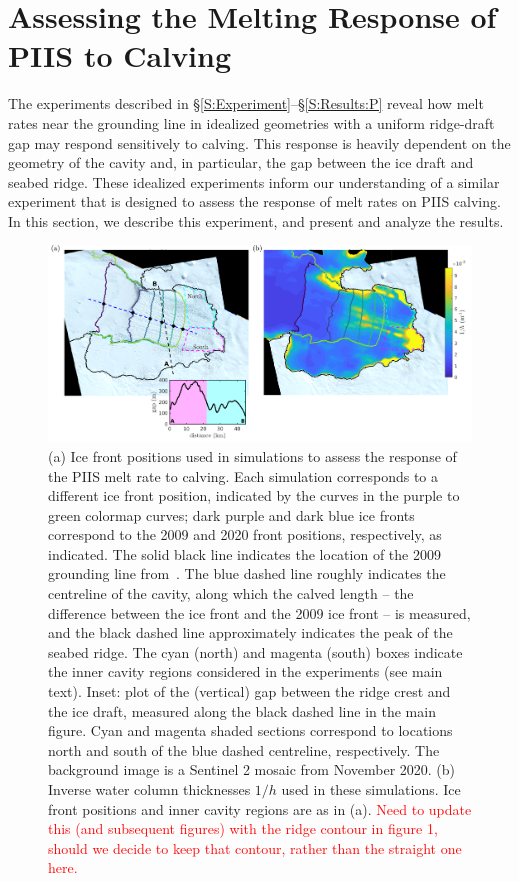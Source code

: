 \documentclass[draft]{agujournal2019}
\newcommand{\red}[1]{\textcolor{red}{#1}}
\begin{document}
\section{Assessing the Melting Response of PIIS to Calving}\label{S:Realistic}
The experiments described in \S\ref{S:Experiment}--\S\ref{S:Results:P} reveal how melt rates near the grounding line in idealized geometries with a uniform ridge-draft gap may respond sensitively to calving. This response is heavily dependent on the geometry of the cavity and, in particular, the gap between the ice draft and seabed ridge. These idealized experiments inform our understanding of a similar experiment that is designed to assess the response of melt rates on PIIS calving. In this section, we describe this experiment, and present and analyze the results.

\begin{figure}
    \centering
    \includegraphics[width =\textwidth]{../make_figures/plots/figure10_combined.pdf}
    \caption{(a) Ice front positions used in simulations to assess the response of the PIIS melt rate to calving. Each simulation corresponds to a different ice front position, indicated by the curves in the purple to green colormap curves; dark purple and dark blue ice fronts correspond to the 2009 and 2020 front positions, respectively, as indicated. The solid black line indicates the location of the 2009 grounding line from~. The blue dashed line roughly indicates the centreline of the cavity, along which the calved length -- the difference between the ice front and the 2009 ice front -- is measured, and the black dashed line approximately indicates the peak of the seabed ridge. The cyan (north) and magenta (south) boxes indicate the inner cavity regions considered in the experiments (see main text). Inset: plot of the (vertical) gap between the ridge crest and the ice draft, measured along the black dashed line in the main figure. Cyan and magenta shaded sections correspond to locations north and south of the blue dashed centreline, respectively. The background image is a Sentinel 2 mosaic from November 2020. (b) Inverse water column thicknesses $1/h$ used in these simulations. Ice front positions and inner cavity regions are as in (a). \red{Need to update this (and subsequent figures) with the ridge contour in figure 1, should we decide to keep that contour, rather than the straight one here.}}
    \label{fig:figure10}
\end{figure}
\end{document}

